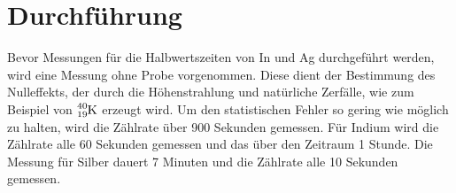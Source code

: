 \section{Durchführung}
\label{sec:Durchführung}

Bevor Messungen für die Halbwertszeiten von In und Ag durchgeführt werden, wird eine Messung ohne Probe vorgenommen.
Diese dient der Bestimmung des Nulleffekts, der durch die Höhenstrahlung und natürliche Zerfälle, wie zum Beispiel von $\ce{^{40}_19K}$ erzeugt wird.
Um den statistischen Fehler so gering wie möglich zu halten, wird die Zählrate über 900 Sekunden gemessen.
Für Indium wird die Zählrate alle 60 Sekunden gemessen und das über den Zeitraum 1 Stunde.
Die Messung für Silber dauert 7 Minuten und die Zählrate alle 10 Sekunden gemessen.

